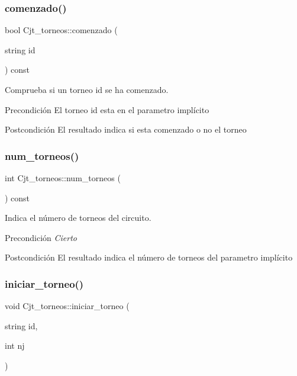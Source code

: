 \subsubsection{\texorpdfstring{comenzado()}{comenzado()}}
{\footnotesize\ttfamily bool Cjt\+\_\+torneos\+::comenzado (\begin{DoxyParamCaption}\item[{string}]{id }\end{DoxyParamCaption}) const}



Comprueba si un torneo id se ha comenzado. 

\begin{DoxyPrecond}{Precondición}
El torneo id esta en el parametro implícito 
\end{DoxyPrecond}
\begin{DoxyPostcond}{Postcondición}
El resultado indica si esta comenzado o no el torneo 
\end{DoxyPostcond}
\mbox{\label{class_cjt__torneos_aba6d57df308bdbfa173578c108e19b82}} 
\subsubsection{\texorpdfstring{num\+\_\+torneos()}{num\_torneos()}}
{\footnotesize\ttfamily int Cjt\+\_\+torneos\+::num\+\_\+torneos (\begin{DoxyParamCaption}{ }\end{DoxyParamCaption}) const}



Indica el número de torneos del circuito. 

\begin{DoxyPrecond}{Precondición}
{\itshape Cierto} 
\end{DoxyPrecond}
\begin{DoxyPostcond}{Postcondición}
El resultado indica el número de torneos del parametro implícito 
\end{DoxyPostcond}
\mbox{\label{class_cjt__torneos_a6b77c538bd9a25a0ec6563849736e6d6}} 
\subsubsection{\texorpdfstring{iniciar\+\_\+torneo()}{iniciar\_torneo()}}
{\footnotesize\ttfamily void Cjt\+\_\+torneos\+::iniciar\+\_\+torneo (\begin{DoxyParamCaption}\item[{string}]{id,  }\item[{int}]{nj }\end{DoxyParamCaption})}



